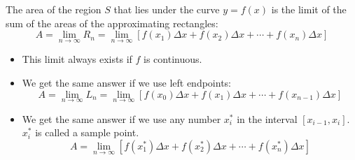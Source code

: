 \begin{frame}
\begin{definition}
The area of the region $S$ that lies under the curve $y = f(x)$ is the limit of the sum of the areas of the approximating rectangles:
\abovedisplayskip=0pt
\belowdisplayskip=0pt
\[
A = \lim_{n\to\infty} R_n = \lim_{n\to\infty} [ f(x_1)\Delta x + f(x_2) \Delta x + \cdots + f(x_n) \Delta x]
\]
\end{definition}
\begin{itemize}
\item<2->  This limit always exists if $f$ is continuous.
\item<3->  We get the same answer if we use left endpoints:
\abovedisplayskip=0pt
\belowdisplayskip=0pt
\[
A = \lim_{n\to\infty} L_n = \lim_{n\to\infty} [ f(x_0)\Delta x + f(x_1) \Delta x + \cdots + f(x_{n-1}) \Delta x]
\]
\item<4->  We get the same answer if we use any number $x_i^*$ in the interval $[x_{i-1},x_i]$.  $x_i^*$ is called a sample point.
\abovedisplayskip=0pt
\belowdisplayskip=0pt
\[
A = \lim_{n\to\infty} [ f(x_1^*)\Delta x + f(x_2^*) \Delta x + \cdots + f(x_{n}^*) \Delta x]
\]
\end{itemize}
%
\end{frame}
